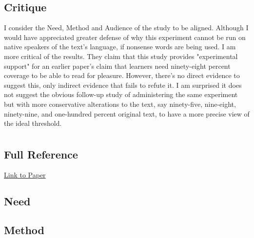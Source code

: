 \documentclass[
	letterpaper, %
]{jdf}
\begin{document}
\subsection{Critique}
I consider the Need, Method and Audience of the study to be aligned. Although I would have appreciated greater defense of why this experiment cannot be run on native speakers of the text's language, if nonsense words are being used. I am more critical of the results. They claim that this study provides "experimental support" for an earlier paper's claim that learners need ninety-eight percent coverage to be able to read for pleasure. However, there's no direct evidence to suggest this, only indirect evidence that fails to refute it. I am surprised it does not suggest the obvious follow-up study of administering the same experiment but with more conservative alterations to the text, say ninety-five, nine-eight, ninety-nine, and one-hundred percent original text, to have a more precise view of the ideal threshold. 

\section{\cite{wu2024indepth}}
\subsection{Full Reference}

\href{https://arxiv.org/pdf/2403.04963}{Link to Paper}

\subsection{Need}

\subsection{Method}
\end{document}
